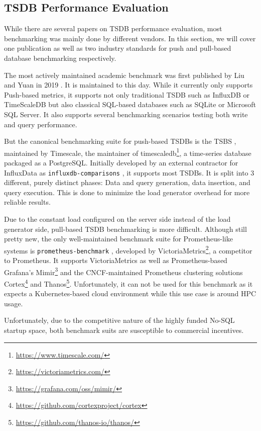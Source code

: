 \subsection{TSDB Performance Evaluation}
While there are several papers on \ac{TSDB} performance evaluation, most benchmarking was mainly
done by different vendors. In this section, we will cover one publication as well as two
industry standards for push and pull-based database benchmarking respectively.

The most actively maintained academic benchmark was first published by Liu and Yuan in 2019 \cite{benchmark_paper}.
It is maintained to this day. While it currently only supports Push-based metrics, it supports not
only traditional \ac{TSDB} such as InfluxDB or TimeScaleDB but also classical SQL-based databases
such as SQLite or Microsoft SQL Server. It also supports several benchmarking scenarios testing
both write and query performance.

But the canonical benchmarking suite for push-based \acp{TSDB} is the \ac{TSBS} \cite{tsbs}, 
maintained by Timescale, the maintainer of timescaledb\footnote{\url{https://www.timescale.com/}}, a 
time-series database packaged as a PostgreSQL. Initially developed by an external contractor
for InfluxData as \texttt{influxdb-comparisons} \cite{influxcomp}, it supports most \acp{TSDB}.
It is split into 3 different, purely distinct phases: Data and query generation, data insertion,
and query execution. This is done to minimize the load generator overhead for more reliable results.

Due to the constant load configured on the server side instead of the load generator side, pull-based
\ac{TSDB} benchmarking is more difficult. Although still pretty new, the only well-maintained
benchmark suite for Prometheus-like systems is \texttt{prometheus-benchmark} \cite{prombench}, developed by 
VictoriaMetrics\footnote{\url{https://victoriametrics.com/}}, a competitor to Prometheus. It supports
VictoriaMetrics as well as Prometheus-based Grafana's Mimir\footnote{\url{https://grafana.com/oss/mimir/}}
and the \ac{CNCF}-maintained Prometheus clustering solutions Cortex\footnote{\url{https://github.com/cortexproject/cortex}}
and Thanos\footnote{\url{https://github.com/thanos-io/thanos/}}. Unfortunately, it can not be used for
this benchmark as it expects a Kubernetes-based cloud environment while this use case is around \ac{HPC} usage.

Unfortunately, due to the competitive nature of the highly funded No-SQL startup space, both
benchmark suits are susceptible to commercial incentives.


